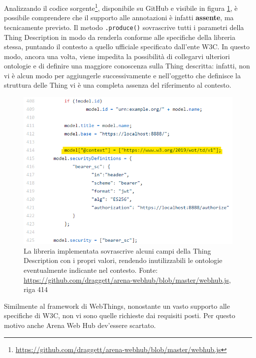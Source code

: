 \documentclass[12pt,a4paper,openright,oneside]{report}
\begin{document}
Analizzando il codice sorgente\footnote{\url{https://github.com/draggett/arena-webhub/blob/master/webhub.js}}, disponibile su GitHub e visibile in figura \ref{fig:context-overwritten}, è possibile comprendere che il supporto alle annotazioni è infatti \textbf{assente}, ma tecnicamente previsto. Il metodo \texttt{.produce()} sovrascrive tutti i parametri della Thing Description in modo da renderla conforme alle specifiche della libreria stessa, puntando il contesto a quello ufficiale specificato dall'ente W3C. In questo modo, ancora una volta, viene impedita la possibilità di collegarvi ulteriori ontologie e di definire una maggiore conoscenza sulla Thing descritta: infatti, non vi è alcun modo per aggiungerle successivamente e nell'oggetto che definisce la struttura delle Thing vi è una completa assenza del riferimento al contesto.\\

\begin{figure}[h]
	\centering
	\includegraphics[scale=1]{eps/context_overwritten.png}
	\caption{La libreria implementata sovrascrive alcuni campi della Thing Description con i propri valori, rendendo inutilizzabili le ontologie eventualmente indicante nel contesto. Fonte: \url{https://github.com/draggett/arena-webhub/blob/master/webhub.js}, riga 414}
	\label{fig:context-overwritten}
\end{figure}

Similmente al framework di WebThings, nonostante un vasto supporto alle specifiche di W3C, non vi sono quelle richieste dai requisiti posti. Per questo motivo anche Arena Web Hub dev'essere scartato.


\clearpage
\end{document}
